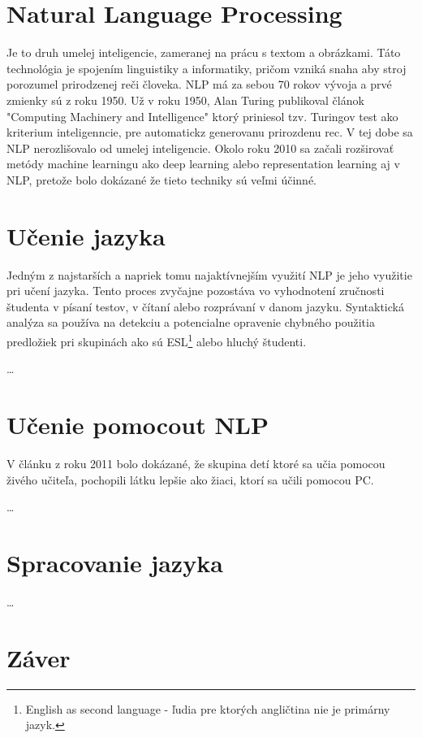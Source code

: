 \documentclass[10pt,twoside,slovak,a4paper]{article}
\begin{document}
\section{Natural Language Processing} \label{NLP}
\begin{flushleft}Je to druh umelej inteligencie, zameranej na prácu s textom a obrázkami.  
Táto technológia je spojením linguistiky a informatiky, 
pričom vzniká snaha aby stroj porozumel prirodzenej reči človeka.
NLP má za sebou 70 rokov vývoja a prvé zmienky sú z roku 1950\cite{historia}.
Už v roku 1950, Alan Turing publikoval článok "Computing Machinery and Intelligence"\cite{turing2009computing} 
ktorý priniesol tzv. Turingov test ako kriterium inteligenncie, pre automatickz generovanu 
prirozdenu rec. V tej dobe sa NLP nerozlišovalo od umelej inteligencie.\linebreak
Okolo roku 2010 sa začali rozširovať metódy machine learningu ako deep learning alebo 
representation learning aj v NLP, pretože bolo dokázané že tieto techniky sú veľmi účinné.
\end{flushleft}

\section{Učenie jazyka} \label{ucenie_jazyka}
Jedným z najstarších a napriek tomu najaktívnejším využití NLP je jeho využitie pri učení jazyka.
Tento proces zvyčajne pozostáva vo vyhodnotení zručnosti študenta v písaní testov, v čítaní alebo
rozprávaní v danom jazyku. Syntaktická analýza sa používa na detekciu a potencialne opravenie chybného použitia
predložiek pri skupinách ako sú ESL\footnote{English as second language - ľudia pre ktorých angličtina nie je primárny jazyk.} alebo hluchý študenti.

\ldots

\section{Učenie pomocout NLP} \label{ucenie_pomocou_nlp}
V článku z roku 2011\cite{clanok_o_studovani} bolo dokázané, že skupina detí ktoré sa učia pomocou živého učiteľa, pochopili látku lepšie ako žiaci,
ktorí sa učili pomocou PC.


\ldots

\section{Spracovanie jazyka} \label{spracovanie_jazyka}

\ldots


\section{Záver} \label{zaver} %




 
\end{document}
